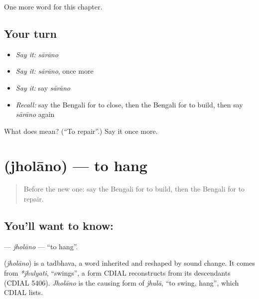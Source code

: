 \begin{grammarlens}[title={What you've built}]
One more word for this chapter.
\end{grammarlens}

\subsection*{Your turn}
\begin{itemize}
\raggedright
  \item \emph{Say it:} \emph{sārāno}
  \item \emph{Say it:} \emph{sārāno}, once more
  \item \emph{Say it:} say \emph{sārāno}
  \item \emph{Recall:} say the Bengali for to close, then the Bengali for to build, then say \emph{sārāno} again
\end{itemize}

\begin{tcolorbox}[breakable,colback=teal!4,colframe=teal!35!black,title={Before you move on}]
What does  mean? (\textquotedblleft{}To repair\textquotedblright{}.) Say it once more.
\end{tcolorbox}
\section[\texorpdfstring{\bn{ঝোলানো} (jholāno)}{ঝোলানো (jholāno)}]{ (jholāno) — to hang}

\label{lesson:BN-C151-jholano}



\begin{quote}
Before the new one: say the Bengali for to build, then the Bengali for to repair.
\end{quote}

\subsection*{You'll want to know: }
\textbf{} — \emph{jholāno} — \textquotedblleft{}to hang\textquotedblright{}.

\begin{cousinweb}
\textbf{} (\emph{jholāno}) is a tadbhava, a word inherited and reshaped by sound change. It comes from \emph{*jhulyati}, \textquotedblleft{}swings\textquotedblright{}, a form CDIAL reconstructs from its descendants (CDIAL 5406). \emph{Jholāno} is the causing form of \emph{jhulā}, \textquotedblleft{}to swing, hang\textquotedblright{}, which CDIAL lists.
\end{cousinweb}

